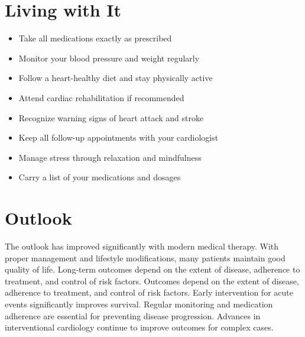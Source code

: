 \section{Living with It}
\begin{itemize}[noitemsep]
  \item Take all medications exactly as prescribed
  \item Monitor your blood pressure and weight regularly
  \item Follow a heart-healthy diet and stay physically active
  \item Attend cardiac rehabilitation if recommended
  \item Recognize warning signs of heart attack and stroke
  \item Keep all follow-up appointments with your cardiologist
  \item Manage stress through relaxation and mindfulness
  \item Carry a list of your medications and dosages
\end{itemize}
\section{Outlook}
The outlook has improved significantly with modern medical therapy. With proper management and lifestyle modifications, many patients maintain good quality of life. Long-term outcomes depend on the extent of disease, adherence to treatment, and control of risk factors. Outcomes depend on the extent of disease, adherence to treatment, and control of risk factors. Early intervention for acute events significantly improves survival. Regular monitoring and medication adherence are essential for preventing disease progression. Advances in interventional cardiology continue to improve outcomes for complex cases.
